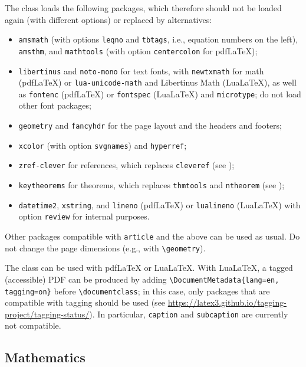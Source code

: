 \documentclass[english,review]{jnsao}
\newcommand{\cs}[1]{\texttt{\textbackslash#1}}
\newcommand{\pkg}[1]{\texttt{#1}}
\begin{document}
The class loads the following packages, which therefore should not be loaded again (with different options) or replaced by alternatives:
\begin{itemize}
    \item \pkg{amsmath} (with options \pkg{leqno} and \pkg{tbtags}, i.e., equation numbers on the left), \pkg{amsthm}, and \pkg{mathtools} (with option \pkg{centercolon} for pdf\LaTeX);
    \item \pkg{libertinus} and \pkg{noto-mono} for text fonts, with \pkg{newtxmath} for math (pdf\LaTeX) or \pkg{lua-unicode-math} and Libertinus Math (Lua\LaTeX), as well as \pkg{fontenc} (pdf\LaTeX) or \pkg{fontspec} (Lua\LaTeX) and \pkg{microtype}; do not load other font packages;
    \item \pkg{geometry} and \pkg{fancyhdr} for the page layout and the headers and footers;
    \item \pkg{xcolor} (with option \pkg{svgnames}) and \pkg{hyperref};
    \item \pkg{zref-clever} for references, which replaces \pkg{cleveref} (see );
    \item \pkg{keytheorems} for theorems, which replaces \pkg{thmtools} and \pkg{ntheorem} (see );
    \item \pkg{datetime2}, \pkg{xstring}, and \pkg{lineno} (pdf\LaTeX) or \pkg{lualineno} (Lua\LaTeX) with option \pkg{review} for internal purposes.
\end{itemize}
Other packages compatible with \pkg{article} and the above can be used as usual. Do not change the page dimensions (e.g., with \cs{geometry}).

The class can be used with pdf\LaTeX{} or Lua\LaTeX{}. With Lua\LaTeX, a tagged (accessible) PDF can be produced by adding \verb!\DocumentMetadata{lang=en, tagging=on}! before \verb!\documentclass!; in this case, only packages that are compatible with tagging should be used (see \url{https://latex3.github.io/tagging-project/tagging-status/}). In particular, \pkg{caption} and \pkg{subcaption} are currently not compatible.

\subsection{Mathematics}\label{sec:math}
\end{document}
